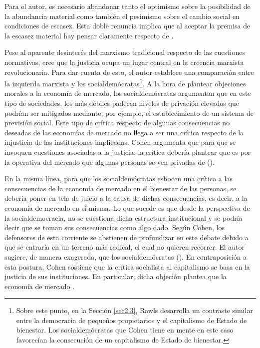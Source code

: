 Para el autor, es necesario abandonar tanto el optimismo sobre la posibilidad de la abundancia material como también el pesimismo sobre el cambio social en condiciones de escasez. Esta doble renuncia implica que al aceptar la premisa de la escasez material hay pensar claramente respecto de  \citep[p. 156]{Cohen_2001}.

Pese al aparente desinterés del marxismo tradicional respecto de las cuestiones normativas, \citet{Cohen_2014a} cree que la justicia ocupa un lugar central en la creencia marxista revolucionaria. Para dar cuenta de esto, el autor establece una comparación entre la izquierda marxista y los socialdemócratas\footnote{Sobre este punto, en la Sección \ref{sec2.3}, Rawls desarrolla un contraste similar entre la democracia de pequeños propietarios y el capitalismo de Estado de bienestar. Los socialdemócratas que Cohen tiene en mente en este caso favorecían la consecución de un capitalismo de Estado de bienestar.}. A la hora de plantear objeciones morales a la economía de mercado, los socialdemócratas argumentan que en este tipo de sociedades, los más débiles padecen niveles de privación elevados que podrían ser mitigados mediante, por ejemplo, el establecimiento de un sistema de previsión social. Este tipo de crítica respecto de algunas consecuencias no deseadas de las economías de mercado no llega a ser una crítica respecto de la injusticia de las instituciones implicadas. Cohen argumenta que para que se invoquen cuestiones asociadas a la justicia, la crítica debería plantear que es por la operativa del mercado que algunas personas se ven privadas de  (\citeyear[p. 40]{Cohen_2014a}). 

En la misma línea, para que los socialdemócratas esbocen una crítica a las consecuencias de la economía de mercado en el bienestar de las personas, se debería poner en tela de juicio a la causa de dichas consecuencias, es decir, a la economía de mercado en sí misma. Lo que sucede es que desde la perspectiva de la socialdemocracia, no se cuestiona dicha estructura institucional y se podría decir que se toman sus consecuencias como algo dado. Según Cohen, los defensores de esta corriente se abstienen de profundizar en este debate debido a que se entraría en un terreno más radical, el cual no quieren recorrer. El autor sugiere, de manera exagerada, que los socialdemócratas  (\citeyear[p. 43-44]{Cohen_2014a}). En contraposición a esta postura, Cohen sostiene que la crítica socialista al capitalismo se basa en la justicia de sus instituciones. En particular, dicha objeción plantea que la economía de mercado  \citep[p. 41]{Cohen_2014a}.


